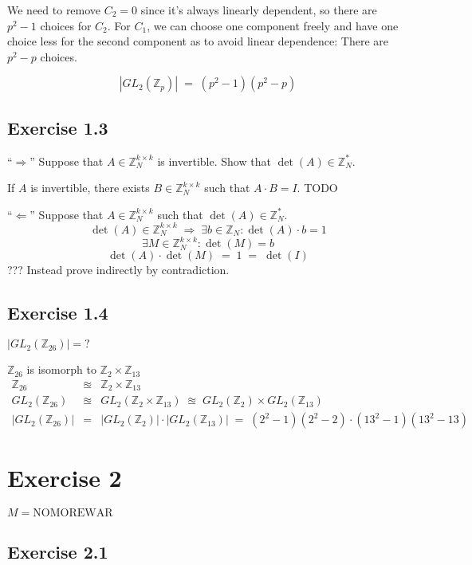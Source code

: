 \documentclass[a4paper]{scrreprt}
\begin{document}
We need to remove $C_2 = 0$ since it's always linearly dependent, so there are $p^2 - 1$ choices for $C_2$.
For $C_1$, we can choose one component freely and have one choice less for the second component as to avoid
linear dependence: There are $p^2-p$ choices.

\[\left|GL_2(\mathbb Z_p)\right|\;=\;(p^2-1)(p^2-p)\]

\subsection*{Exercise 1.3}

``$\Rightarrow$'' Suppose that $A\in\mathbb Z_N^{k\times k}$ is invertible. Show that $\det(A)\in\mathbb Z_N^*$.

If $A$ is invertible, there exists $B\in\mathbb Z_N^{k\times k}$ such that $A\cdot B = I$.
TODO

``$\Leftarrow$'' Suppose that $A\in\mathbb Z_N^{k\times k}$ such that $\det(A)\in\mathbb Z_N^*$.
\[\det(A)\in\mathbb Z_N^{k\times k}\;\Rightarrow\;\exists b\in\mathbb Z_N: \det(A)\cdot b=1\]
\[\exists M\in\mathbb Z_N^{k\times k}: \det(M) = b\]
\[\det(A)\cdot\det(M)\;=\;1\;=\;\det(I)\]
??? Instead prove indirectly by contradiction.

\subsection*{Exercise 1.4}

$|GL_2(\mathbb Z_{26})| = ?$ 


$\mathbb Z_{26}$ is isomorph to $\mathbb Z_2\times\mathbb Z_{13}$
\begin{eqnarray*}
    \mathbb Z_{26} &\approxeq& \mathbb Z_2\times\mathbb Z_{13}\\
    GL_2(\mathbb Z_{26}) &\approxeq& GL_2(\mathbb Z_2\times \mathbb Z_{13})
        \;\approxeq\;GL_2(\mathbb Z_2)\times GL_2(\mathbb Z_{13})\\
    |GL_2(\mathbb Z_{26})| &=& |GL_2(\mathbb Z_2)|\cdot|GL_2(\mathbb Z_{13})|
        \;=\;(2^2-1)(2^2-2)\cdot(13^2-1)(13^2-13)
\end{eqnarray*}

\section*{Exercise 2}

$M = \mathrm{NOMOREWAR}$

\subsection*{Exercise 2.1}
\end{document}
